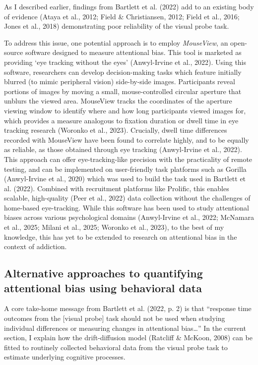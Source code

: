 \documentclass[authordate, empirical]{jote-new-article}
\begin{document}
	As I described earlier, findings from Bartlett et al. (2022) add to an existing body of evidence (Ataya et al., 2012; Field \& Christiansen, 2012; Field et al., 2016; Jones et al., 2018) demonstrating poor reliability of the visual probe task.



	To address this issue, one potential approach is to employ \emph{MouseView}, an open-source software designed to measure attentional bias. This tool is marketed as providing ‘eye tracking without the eyes' (Anwyl-Irvine et al., 2022). Using this software, researchers can develop decision-making tasks which feature initially blurred (to mimic peripheral vision) side-by-side images. Participants reveal portions of images by moving a small, mouse-controlled circular aperture that unblurs the viewed area. MouseView tracks the coordinates of the aperture viewing window to identify where and how long participants viewed images for, which provides a measure analogous to fixation duration or dwell time in eye tracking research (Woronko et al., 2023). Crucially, dwell time differences recorded with MouseView have been found to correlate highly, and to be equally as reliable, as those obtained through eye tracking (Anwyl-Irvine et al., 2022). This approach can offer eye-tracking-like precision with the practicality of remote testing, and can be implemented on user-friendly task platforms such as Gorilla (Anwyl-Irvine et al., 2020) which was used to build the task used in Bartlett et al. (2022). Combined with recruitment platforms like Prolific, this enables scalable, high-quality (Peer et al., 2022) data collection without the challenges of home-based eye-tracking. While this software has been used to study attentional biases across various psychological domains (Anwyl-Irvine et al., 2022; McNamara et al., 2025; Milani et al., 2025; Woronko et al., 2023), to the best of my knowledge, this has yet to be extended to research on attentional bias in the context of addiction.



	\subsection{Alternative approaches to quantifying attentional bias using behavioral data}



	A core take-home message from Bartlett et al. (2022, p. 2) is that “response time outcomes from the [visual probe] task should not be used when studying individual differences or measuring changes in attentional bias…” In the current section, I explain how the drift-diffusion model (Ratcliff \& McKoon, 2008) can be fitted to routinely collected behavioral data from the visual probe task to estimate underlying cognitive processes.
\end{document}
